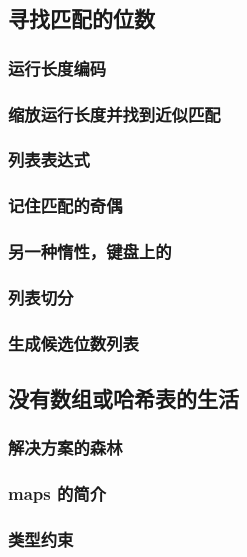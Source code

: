 \documentclass[./main.tex]{subfiles}
\begin{document}
\subsection*{寻找匹配的位数}

\subsubsection*{运行长度编码}

\subsubsection*{缩放运行长度并找到近似匹配}

\subsubsection*{列表表达式}

\subsubsection*{记住匹配的奇偶}

\subsubsection*{另一种惰性，键盘上的}

\subsubsection*{列表切分}

\subsubsection*{生成候选位数列表}

\subsection*{没有数组或哈希表的生活}

\subsubsection*{解决方案的森林}

\subsubsection*{maps 的简介}

\subsubsection*{类型约束}
\end{document}
